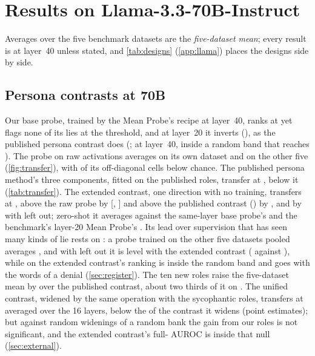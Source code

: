 \section{Results on Llama-3.3-70B-Instruct}
\label{sec:llama}

Averages over the five benchmark datasets are the \emph{five-dataset mean}; every result is at layer~40
unless stated, and \cref{tab:designs} (\cref{app:llama}) places the designs side by side.

\subsection{Persona contrasts at 70B}
\label{sec:persona}

Our base probe, trained by the Mean Probe's recipe at layer~40, ranks \hpkr{} at 
yet flags none of its  lies at the threshold, and at layer~20 it inverts
(), as the published persona contrast does (; 
at layer~40, inside a random band that reaches ). The probe on raw activations averages
 on its own dataset and  on the other five (\cref{fig:transfer}), with
 of its  off-diagonal cells below chance. The published persona method's
three components, fitted on the published roles, transfer at , below it
(\cref{tab:transfer}). The extended contrast, one direction with no training, transfers at
, above the raw probe by  [,
] and above the published contrast () by
, and by  with \hpkr{} left out; zero-shot it
averages  against the same-layer base probe's  and the benchmark's
layer-20 Mean Probe's . Its lead over supervision that has seen many kinds of lie
rests on \hpkr: a probe trained on the other five datasets pooled averages , and with
\hpkr{} left out it is level with the extended contrast ( against ), while
on \hpkr{} the extended contrast's ranking is inside the random band and goes with the words of a denial
(\cref{sec:register}). The ten new roles raise the
five-dataset mean by  over the published contrast, about two thirds of it
on \hpkr. The unified contrast, widened by the same operation with the sycophantic roles, transfers at
 averaged over the 16 layers, below the  of the contrast it widens
(point estimates); but against random widenings of a random bank the gain from our roles is not
significant, and the extended contrast's full-\hpkr{} AUROC is inside that null (\cref{sec:external}).


